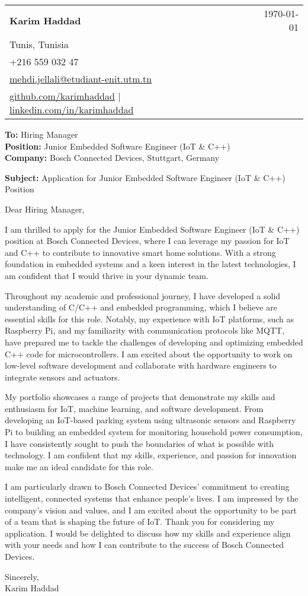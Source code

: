 \documentclass[letterpaper,11pt]{article}
\makeatletter
\newcommand{\letterHeading}[5]{
    \begin{tabular*}{\textwidth}{l@{\extracolsep{\fill}}r}
    \textbf{\Large #1} & #5 \\  %
    #2 & \\
    #3 & \\
    #4 & \\
    \end{tabular*}
    \vspace{15pt}
}
\newcommand{\letterRecipient}[3]{
    \textbf{\large To:} #1 \\
    \textbf{\large Position:} #2 \\
    \textbf{\large Company:} #3 \\
    \vspace{12pt}
}
\newcommand{\letterSubject}[1]{
    \textbf{\large Subject:} #1 \\
    \vspace{15pt}
}
\makeatother
\begin{document}
    \letterHeading
    {Karim Haddad}
    {Tunis, Tunisia}
    {+216 559 032 47 \\ \href{mailto:mehdi.jellali@etudiant-enit.utm.tn}{mehdi.jellali@etudiant-enit.utm.tn}}
    {\href{https://github.com/karimhaddad}{github.com/karimhaddad} $|$ \href{https://www.linkedin.com/in/karimhaddad}{linkedin.com/in/karimhaddad}}
    {\today}

    \letterRecipient
    {Hiring Manager}
    {Junior Embedded Software Engineer (IoT & C++)}
    {Bosch Connected Devices, Stuttgart, Germany}

    \letterSubject{Application for Junior Embedded Software Engineer (IoT & C++) Position}

    Dear Hiring Manager,

    I am thrilled to apply for the Junior Embedded Software Engineer (IoT & C++) position at Bosch Connected Devices, where I can leverage my passion for IoT and C++ to contribute to innovative smart home solutions. With a strong foundation in embedded systems and a keen interest in the latest technologies, I am confident that I would thrive in your dynamic team.

    Throughout my academic and professional journey, I have developed a solid understanding of C/C++ and embedded programming, which I believe are essential skills for this role. Notably, my experience with IoT platforms, such as Raspberry Pi, and my familiarity with communication protocols like MQTT, have prepared me to tackle the challenges of developing and optimizing embedded C++ code for microcontrollers. I am excited about the opportunity to work on low-level software development and collaborate with hardware engineers to integrate sensors and actuators.

    My portfolio showcases a range of projects that demonstrate my skills and enthusiasm for IoT, machine learning, and software development. From developing an IoT-based parking system using ultrasonic sensors and Raspberry Pi to building an embedded system for monitoring household power consumption, I have consistently sought to push the boundaries of what is possible with technology. I am confident that my skills, experience, and passion for innovation make me an ideal candidate for this role.

    I am particularly drawn to Bosch Connected Devices' commitment to creating intelligent, connected systems that enhance people's lives. I am impressed by the company's vision and values, and I am excited about the opportunity to be part of a team that is shaping the future of IoT. Thank you for considering my application. I would be delighted to discuss how my skills and experience align with your needs and how I can contribute to the success of Bosch Connected Devices.

    Sincerely,\\[12pt]

    Karim Haddad
\end{document}

